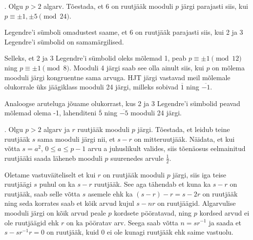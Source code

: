 \documentclass[a4paper, 10pt]{article}
\newcommand{\w}{\overline}
\begin{document}
. Olgu $p>2$ algarv. Tõestada, et 6 on ruutjääk mooduli $p$ järgi parajasti siis, kui $p\equiv \pm1,\pm5\pmod{24}$. 

\bigskip
Legendre'i sümboli omadustest saame, et 6 on ruutjääk parajasti siis, kui 2 ja 3 Legendre'i sümbolid on samamärgilised. 

Selleks, et 2 ja 3 Legendre'i sümbolid oleks mõlemad 1, peab $p\equiv\pm1\pmod{12}$ ning $p\equiv\pm1\pmod{8}$. Mooduli 4 järgi saab see olla ainult siis, kui $p$ on mõlema mooduli järgi kongruentne sama arvuga. HJT järgi vastavad meil mõlemale olukorrale üks jäägiklass mooduli 24 järgi, milleks sobivad $\w{1}$ ning $\w{-1}.$ 

Analoogse aruteluga jõuame olukorrast, kus 2 ja 3 Legendre'i sümbolid peavad mõlemad olema -1, lahenditeni $\w{5}$ ning $\w{-5}$ mooduli 24 järgi.


\bigskip

\pagebreak

. Olgu $p>2$ algarv ja $r$ ruutjääk mooduli $p$ järgi. Tõestada, et leidub teine ruutjääk $s$ sama mooduli järgi nii, et $s-r$ on mitteruutjääk. Näidata, et kui võtta $s=a^2$, $0\leq a\leq p-1$ arvu a juhuslikult valides, siis tõenäosus eelmainitud ruutjääki saada läheneb mooduli $p$ suurenedes arvule $\frac12$. 

\bigskip
Oletame vastuväiteliselt et kui $r$ on ruutjääk mooduli $p$ järgi, siis iga teise ruutjäägi $s$ puhul on ka $s-r$ ruutjääk. See aga tähendab et kuna ka $s-r$ on ruutjääk, saab selle võtta $s$ asemele ehk ka $(s-r)-r=s-2r$ on ruutjääk ning seda korrates saab et kõik arvud kujul $s-nr$ on ruutjäägid. Algarvulise mooduli järgi on kõik arvud peale $p$ kordsete pööratavad, ning $p$ kordsed arvud ei ole ruutjäägid ehk $r$ on ka pööratav arv. Seega saab võtta $n=sr^{-1}$ ja saada et $s-sr^{-1}r=0$ on ruutjääk, kuid 0 ei ole kunagi ruutjääk ehk saime vastuolu.
\end{document}
